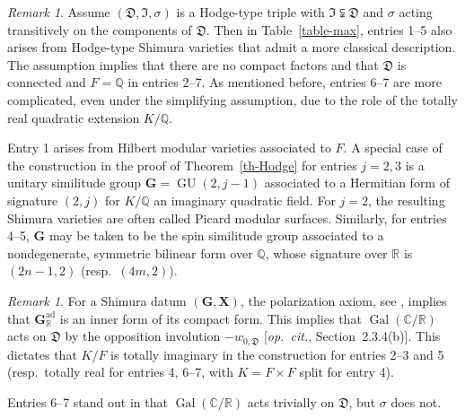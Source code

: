\documentclass[11pt]{amsart}
\numberwithin{equation}{section}
\theoremstyle{definition}
\theoremstyle{remark}
\newtheorem{rmk}[theorem]{Remark}
\newcommand{\Dfr}{{\mathfrak D}}
\newcommand{\Ifr}{{\mathfrak I}}
\newcommand{\CC}{\mathbb{C}}
\newcommand{\QQ}{\mathbb{Q}}
\newcommand{\RR}{\mathbb{R}}
\DeclareMathOperator{\ad}{ad}
\DeclareMathOperator{\gal}{Gal}
\DeclareMathOperator{\GU}{GU}
\newcommand{\gx}{(\mathbf G, \mathbf X)}
\newcommand{\opcitn}{{\em op.\ cit.}}
\begin{document}
\begin{rmk}
 \label{rmk-classical-cases}  
 Assume $(\Dfr, \Ifr,\sigma)$ is a Hodge-type triple with $\Ifr \subsetneqq \Dfr$ and $\sigma$ acting transitively on the components of $\Dfr$. Then in Table~\ref{table-max}, entries 1--5 also arises from Hodge-type Shimura varieties that admit a more classical description. 
 The assumption implies that there are no compact factors and that $\Dfr$ is connected and $F=\QQ$ in entries 2--7.  As mentioned before, entries 6--7 are more complicated, even under the simplifying assumption, due to the role of the totally real quadratic extension $K/\QQ$.
 
 Entry 1 arises from Hilbert modular varieties associated to $F$. A special case of the construction in the proof of Theorem~\ref{th-Hodge} for entries $j=2,3$ is a unitary similitude group $\mathbf{G}=\GU(2,j-1)$ associated to a Hermitian form of signature $(2,j)$ for $K/\QQ$ an imaginary quadratic field. For $j=2$, the resulting Shimura varieties are often called Picard modular surfaces. Similarly, for entries 4--5, $\mathbf{G}$ may be taken to be the spin similitude group associated to a nondegenerate, symmetric bilinear form over $\QQ$, whose signature over $\RR$ is $(2n-1,2)$ (resp.\ $(4m,2)$).   


 \end{rmk}
\begin{rmk}
    \label{rmk-inner-form-cpt}
For a Shimura datum $\gx$, the polarization axiom, see \cite[Equation~(2.1.1.2)]{Deligne-Shimura-varieties}, implies that $\mathbf{G}_{\RR}^{\ad}$ is an inner form of its compact form. This implies that $\gal(\CC/\RR)$ acts on $\Dfr$ by the opposition involution $-w_{0,\Dfr}$ [\opcitn, Section~2.3.4(b)]. This dictates that $K/F$ is totally imaginary in the construction for entries 2--3 and 5 (resp.\ totally real for entries 4, 6--7, with $K=F \times F$ split for entry 4). 

Entries 6--7 stand out in that $\gal(\CC/\RR)$ acts trivially on $\Dfr$, but $\sigma$ does not.
\end{rmk}



\newcommand{\etalchar}[1]{$^{#1}$}
\providecommand{\bysame}{\leavevmode\hbox to3em{\hrulefill}\thinspace}
\end{document}
